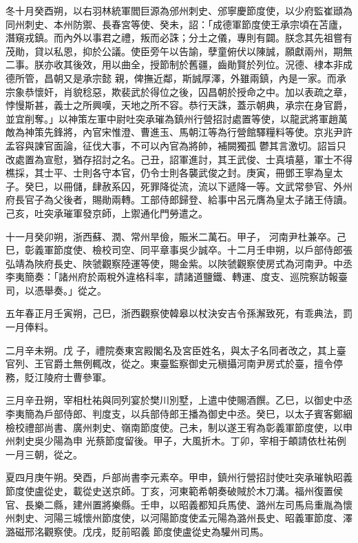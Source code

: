 \begin{pinyinscope}
 冬十月癸酉朔，以右羽林統軍閻巨源為邠州刺史、邠寧慶節度使，以少府監崔頲為同州刺史、本州防禦、長春宮等使、癸未，詔：「成德軍節度使王承宗頃在苫廬，潛窺戎鎮。而內外以事君之禮，叛而必誅；分土之儀，專則有闢。朕念其先祖嘗有茂勛，貸以私恩，抑於公議。使臣旁午以告諭，孽童俯伏以陳誠，願獻兩州，期無二事。朕亦收其後效，用以曲全，授節制於舊疆，齒勛賢於列位。況德、棣本非成德所管，昌朝又是承宗懿
 親，俾撫近鄰，斯誠厚澤，外雖兩鎮，內是一家。而承宗象恭懷奸，肖貌稔惡，欺裴武於得位之後，囚昌朝於授命之中。加以表疏之章，悖慢斯甚，義士之所興嘆，天地之所不容。恭行天誅，蓋示朝典，承宗在身官爵，並宜削奪。」以神策左軍中尉吐突承璀為鎮州行營招討處置等使，以龍武將軍趙萬敵為神策先鋒將，內官宋惟澄、曹進玉、馬朝江等為行營館驛糧料等使。京兆尹許孟容與諫官面論，征伐大事，不可以內官為將帥，補闕獨孤
 鬱其言激切。詔旨只改處置為宣慰，猶存招討之名。己丑，詔軍進討，其王武俊、士真墳墓，軍士不得樵採，其士平、士則各守本官，仍令士則各襲武俊之封。庚寅，冊鄧王寧為皇太子。癸巳，以冊儲，肆赦系囚，死罪降從流，流以下遞降一等。文武常參官、外州府長官子為父後者，賜勛兩轉。工部侍郎歸登、給事中呂元膺為皇太子諸王侍讀。己亥，吐突承璀軍發京師，上禦通化門勞遣之。



 十一月癸卯朔，浙西蘇、潤、常州旱儉，賑米二萬石。甲子，
 河南尹杜兼卒。己巳，彰義軍節度使、檢校司空、同平章事吳少誠卒。十二月壬申朔，以戶部侍郎張弘靖為陜府長史、陜虢觀察陸運等使，賜金紫。以陜虢觀察使房式為河南尹。中丞李夷簡奏：「諸州府於兩稅外違格科率，請諸道鹽鐵、轉運、度支、巡院察訪報臺司，以憑舉奏。」從之。



 五年春正月壬寅朔，己巳，浙西觀察使韓皋以杖決安吉令孫澥致死，有乖典法，罰一月俸料。



 二月辛未朔。戊
 子，禮院奏東宮殿閣名及宮臣姓名，與太子名同者改之，其上臺官列、王官爵土無例輒改，從之。東臺監察御史元稹攝河南尹房式於臺，擅令停務，貶江陵府士曹參軍。



 三月辛丑朔，宰相杜祐與同列宴於樊川別墅，上遣中使賜酒饌。乙巳，以御史中丞李夷簡為戶部侍郎、判度支，以兵部侍郎王播為御史中丞。癸巳，以太子賓客鄭絪檢校禮部尚書、廣州刺史、嶺南節度使。己未，制以遂王宥為彰義軍節度使，以申州刺史吳少陽為申
 光蔡節度留後。甲子，大風折木。丁卯，宰相于頔請依杜祐例一月三朝，從之。



 夏四月庚午朔。癸酉，戶部尚書李元素卒。甲申，鎮州行營招討使吐突承璀執昭義節度使盧從史，載從史送京師。丁亥，河東範希朝奏破賊於木刀溝。福州復置侯官、長樂二縣，建州置將樂縣。壬申，以昭義都知兵馬使、潞州左司馬烏重胤為懷州刺史、河陽三城懷州節度使，以河陽節度使孟元陽為潞州長史、昭義軍節度、澤潞磁邢洺觀察使。戊戌，貶前昭義
 節度使盧從史為驩州司馬。




\end{pinyinscope}
